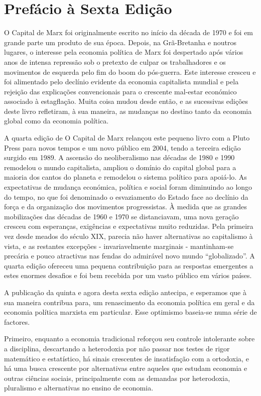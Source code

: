 \chapter{Prefácio à Sexta Edição}\label{Prefácio à Sexta Edição}
 \par 
O Capital de Marx foi originalmente escrito no início da década de 1970 e foi em grande parte um produto de sua época. Depois, na Grã-Bretanha e noutros lugares, o interesse pela economia política de Marx foi despertado após vários anos de intensa repressão sob o pretexto de culpar os trabalhadores e os movimentos de esquerda pelo fim do boom do pós-guerra. Este interesse cresceu e foi alimentado pelo declínio evidente da economia capitalista mundial e pela rejeição das explicações convencionais para o crescente mal-estar económico associado à estagflação. Muita coisa mudou desde então, e as sucessivas edições deste livro refletiram, à sua maneira, as mudanças no destino tanto da economia global como da economia política.
 \par 
A quarta edição de O Capital de Marx relançou este pequeno livro com a Pluto Press para novos tempos e um novo público em 2004, tendo a terceira edição surgido em 1989. A ascensão do neoliberalismo nas décadas de 1980 e 1990 remodelou o mundo capitalista, ampliou o domínio do capital global para a maioria dos cantos do planeta e remodelou o sistema político para apoiá-lo. As expectativas de mudança económica, política e social foram diminuindo ao longo do tempo, no que foi denominado o esvaziamento do Estado face ao declínio da força e da organização dos movimentos progressistas. À medida que as grandes mobilizações das décadas de 1960 e 1970 se distanciavam, uma nova geração cresceu com esperanças, exigências e expectativas muito reduzidas. Pela primeira vez desde meados do século XIX, parecia não haver alternativas ao capitalismo à vista, e as restantes excepções - invariavelmente marginais - mantinham-se precária e pouco atractivas nas fendas do admirável novo mundo “globalizado”. A quarta edição ofereceu uma pequena contribuição para as respostas emergentes a estes enormes desafios e foi bem recebida por um vasto público em vários países.
 \par 
A publicação da quinta e agora desta sexta edição antecipa, e esperamos que à sua maneira contribua para, um renascimento da economia política em geral e da economia política marxista em particular. Esse optimismo baseia-se numa série de factores.
 \par 
Primeiro, enquanto a economia tradicional reforçou seu controle intolerante sobre a disciplina, descartando a heterodoxia por não passar nos testes de rigor matemático e estatístico, há sinais crescentes de insatisfação com a ortodoxia, e há uma busca crescente por alternativas entre aqueles que estudam economia e outras ciências sociais, principalmente com as demandas por heterodoxia, pluralismo e alternativas no ensino de economia.
